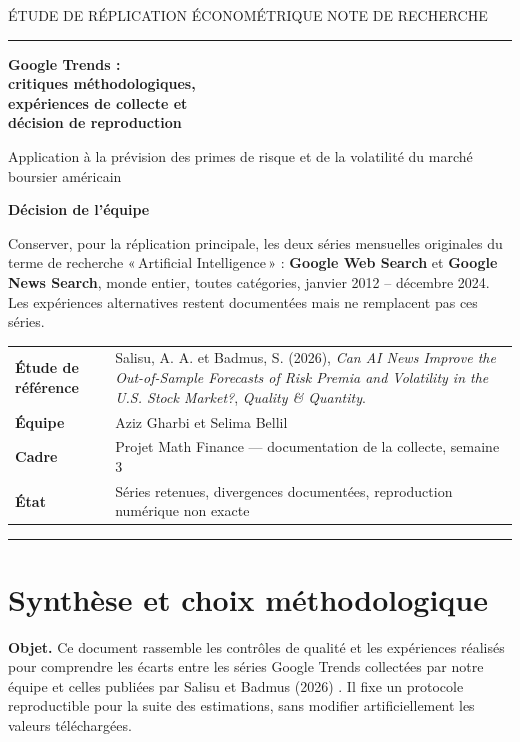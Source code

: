 \documentclass[11pt,a4paper]{article}
\newcommand{\keybox}[2]{\vspace{5pt}\noindent\colorbox{pale}{\parbox{\dimexpr\linewidth-2\fboxsep\relax}{\vspace{5pt}\textbf{\color{navy}#1}\par #2\vspace{5pt}}}\vspace{5pt}}
\begin{document}
\begin{titlepage}
\thispagestyle{empty}
\vspace*{1.2cm}
{\sffamily\color{blue}\large ÉTUDE DE RÉPLICATION ÉCONOMÉTRIQUE \hfill NOTE DE RECHERCHE}\par
\vspace{0.7cm}
{\color{navy}\rule{\textwidth}{1.3pt}}\par
\vspace{1.25cm}
{\sffamily\fontsize{26}{31}\selectfont\bfseries\color{navy} Google Trends :\\ critiques méthodologiques,\\ expériences de collecte et\\ décision de reproduction}\par
\vspace{0.65cm}
{\large\color{graytext} Application à la prévision des primes de risque et de la volatilité du marché boursier américain}\par
\vspace{1.0cm}
\keybox{Décision de l'équipe}{Conserver, pour la réplication principale, les deux séries mensuelles originales du terme de recherche «\,Artificial Intelligence\,» : \textbf{Google Web Search} et \textbf{Google News Search}, monde entier, toutes catégories, janvier 2012 -- décembre 2024. Les expériences alternatives restent documentées mais ne remplacent pas ces séries.}
\vfill
\begin{tabularx}{\textwidth}{@{}>{\bfseries\color{navy}}lY@{}}
Étude de référence & Salisu, A. A. et Badmus, S. (2026), \emph{Can AI News Improve the Out-of-Sample Forecasts of Risk Premia and Volatility in the U.S. Stock Market?}, \emph{Quality \& Quantity}.\\
Équipe & Aziz Gharbi et Selima Bellil\\
Cadre & Projet Math Finance — documentation de la collecte, semaine 3\\
État & Séries retenues, divergences documentées, reproduction numérique non exacte\\
\end{tabularx}
\vspace{0.5cm}
{\color{navy}\rule{\textwidth}{1.3pt}}\par
\end{titlepage}
\tableofcontents
\clearpage

\section{Synthèse et choix méthodologique}
\textbf{Objet.} Ce document rassemble les contrôles de qualité et les expériences réalisés pour comprendre les écarts entre les séries Google Trends collectées par notre équipe et celles publiées par Salisu et Badmus (2026) \cite{SalisuBadmus2026}. Il fixe un protocole reproductible pour la suite des estimations, sans modifier artificiellement les valeurs téléchargées.
\end{document}
